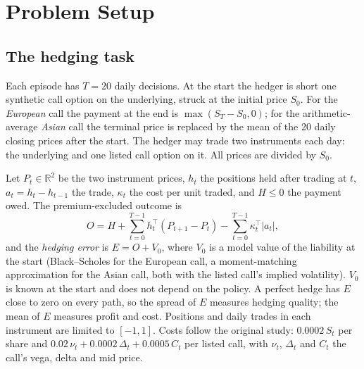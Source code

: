 \documentclass[10pt,conference]{IEEEtran}
\begin{document}
\section{Problem Setup}
\label{sec:setup}

\subsection{The hedging task}
Each episode has $T=20$ daily decisions. At the start the hedger is short one
synthetic call option on the underlying, struck at the initial price $S_0$.
For the \emph{European} call the payment at the end is $\max(S_T-S_0,0)$; for
the arithmetic-average \emph{Asian} call \cite{kemna1990asian} the terminal
price is replaced by the mean of the 20 daily closing prices after the start.
The hedger may trade two instruments each day: the underlying and one listed
call option on it. All prices are divided by $S_0$.

Let $P_t\in\mathbb R^2$ be the two instrument prices, $h_t$ the positions held
after trading at $t$, $a_t=h_t-h_{t-1}$ the trade, $\kappa_t$ the cost per
unit traded, and $H\le 0$ the payment owed. The premium-excluded outcome is
\begin{equation}
 O=H+\sum_{t=0}^{T-1}h_t^\top(P_{t+1}-P_t)-\sum_{t=0}^{T-1}\kappa_t^\top|a_t| ,
 \label{eq:offset}
\end{equation}
and the \emph{hedging error} is $E=O+V_0$, where $V_0$ is a model value of the
liability at the start (Black--Scholes for the European call, a
moment-matching approximation for the Asian call, both with the listed call's
implied volatility). $V_0$ is known at the start and does not depend on the
policy. A perfect hedge has $E$ close to zero on every path, so the spread of
$E$ measures hedging quality; the mean of $E$ measures profit and cost.
Positions and daily trades in each instrument are limited to $[-1,1]$.
Costs follow the original study: $0.0002\,S_t$ per share and
$0.02\,\nu_t+0.0002\,\Delta_t+0.0005\,C_t$ per listed call, with $\nu_t$,
$\Delta_t$ and $C_t$ the call's vega, delta and mid price.
\end{document}
